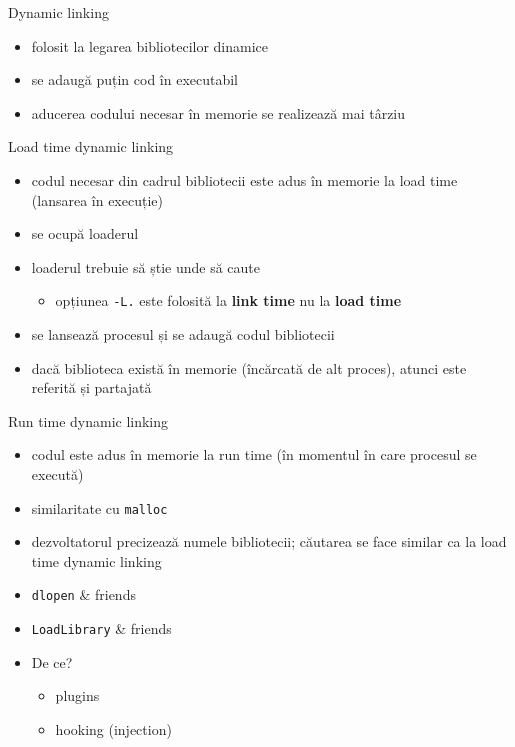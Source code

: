 \documentclass{simple}
\begin{document}
\begin{frame}{Dynamic linking}
  \begin{itemize}
    \item folosit la legarea bibliotecilor dinamice
    \item se adaugă puțin cod în executabil
    \item aducerea codului necesar în memorie se realizează mai târziu
  \end{itemize}
\end{frame}

\begin{frame}{Load time dynamic linking}
  \begin{itemize}
    \item codul necesar din cadrul bibliotecii este adus în memorie la load
    time (lansarea în execuție)
    \item se ocupă loaderul
    \item loaderul trebuie să știe unde să caute
      \begin{itemize}
        \item opțiunea \texttt{-L.} este folosită la \textbf{link time} nu la
        \textbf{load time}
      \end{itemize}
    \item se lansează procesul și se adaugă codul bibliotecii
    \item dacă biblioteca există în memorie (încărcată de alt proces), atunci
    este referită și partajată
  \end{itemize}
\end{frame}

\begin{frame}{Run time dynamic linking}
  \begin{itemize}
    \item codul este adus în memorie la run time (în momentul în care procesul
    se execută)
    \item similaritate cu \texttt{malloc}
    \item dezvoltatorul precizează numele bibliotecii; căutarea se face
    similar ca la load time dynamic linking
    \item \texttt{dlopen} \& friends
    \item \texttt{LoadLibrary} \& friends
    \item De ce?
      \begin{itemize}
        \item plugins
        \item hooking (injection)
      \end{itemize}
  \end{itemize}
\end{frame}
\end{document}
